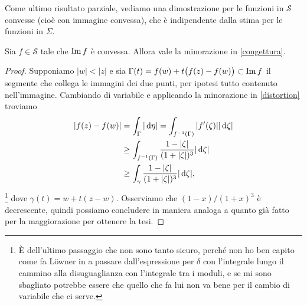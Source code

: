 Come ultimo risultato parziale, vediamo una dimostrazione per le funzioni in $\mathcal{S}$ convesse (cioè con immagine convessa), che è indipendente dalla stima per le funzioni in $\Sigma$.
\begin{prop}
  Sia $f \in \mathcal{S}$ tale che $\operatorname{Im}{f}$ è convessa. Allora vale la minorazione in \eqref{congettura}.
\end{prop}
\begin{proof}
  Supponiamo $|w|<|z|$ e sia $\Gamma(t)=f(w)+t\big(f(z)-f(w)\big) \subset \operatorname{Im}{f}$ il segmente che collega le immagini dei due punti, per ipotesi tutto contenuto nell'immagine. Cambiando di variabile e applicando la minorazione in \eqref{distortion} troviamo
  \begin{align*}
    |f(z)-f(w)|&=\int_{\Gamma} |\mathop{}\!\mathrm{d}\eta|=\int_{f^{-1}(\Gamma)} |f'(\zeta)||\mathop{}\!\mathrm{d}\zeta| \\
    &\ge \int_{f^{-1}(\Gamma)} \frac{1-|\zeta|}{(1+|\zeta|)^3}|\mathop{}\!\mathrm{d}\zeta| \\
    &\ge \int_\gamma \frac{1-|\zeta|}{(1+|\zeta|)^3}|\mathop{}\!\mathrm{d}\zeta|,
  \end{align*}
   \footnote{È dell'ultimo passaggio che non sono tanto sicuro, perché non ho ben capito come fa Löwner in \cite[Section 2]{L} a passare dall'espressione per $\delta$ con l'integrale lungo il cammino alla disuguaglianza con l'integrale tra i moduli, e se mi sono sbagliato potrebbe essere che quello che fa lui non va bene per il cambio di variabile che ci serve.} dove $\gamma(t)=w+t(z-w)$. Osserviamo che $(1-x)/(1+x)^3$ è decrescente, quindi possiamo concludere in maniera analoga a quanto già fatto per la maggiorazione per ottenere la tesi.
\end{proof}
